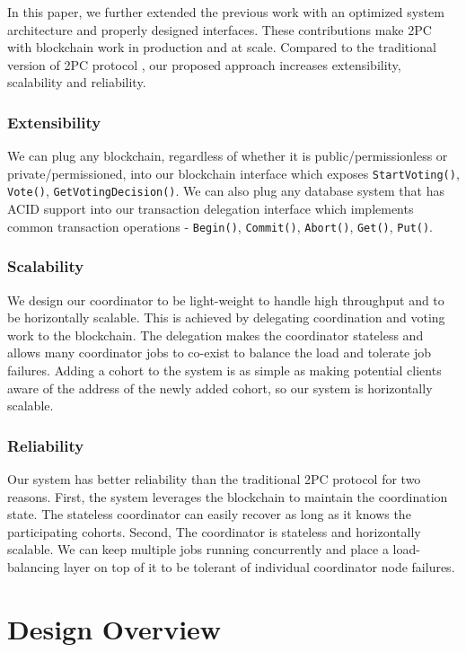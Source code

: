 \documentclass[11pt,conference]{IEEEtran}
\begin{document}
In this paper, we further extended the previous work with an optimized system architecture and properly designed interfaces. These contributions make 2PC with blockchain work in production and at scale. Compared to the traditional version of 2PC protocol \cite{}, our proposed approach increases extensibility, scalability and reliability.

\subsubsection{Extensibility}
We can plug any blockchain, regardless of whether it is public/permissionless or private/permissioned, into our blockchain interface which exposes \texttt{StartVoting()}, \texttt{Vote()}, \texttt{GetVotingDecision()}. We can also plug any database system that has ACID support into our transaction delegation interface which implements common transaction operations - \texttt{Begin()}, \texttt{Commit()}, \texttt{Abort()}, \texttt{Get()}, \texttt{Put()}.

\subsubsection{Scalability}
We design our coordinator to be light-weight to handle high throughput and to be horizontally scalable. This is achieved by delegating coordination and voting work to the blockchain. The delegation makes the coordinator stateless and allows many coordinator jobs to co-exist to balance the load and tolerate job failures. Adding a cohort to the system is as simple as making potential clients aware of the address of the newly added cohort, so our system is horizontally scalable.

\subsubsection{Reliability}
Our system has better reliability than the traditional 2PC protocol for two reasons. First, the system leverages the blockchain to maintain the coordination state. The stateless coordinator can easily recover as long as it knows the participating cohorts. Second, The coordinator is stateless and horizontally scalable. We can keep multiple jobs running concurrently and place a load-balancing layer on top of it to be tolerant of individual coordinator node failures.

\section{Design Overview}
\end{document}
